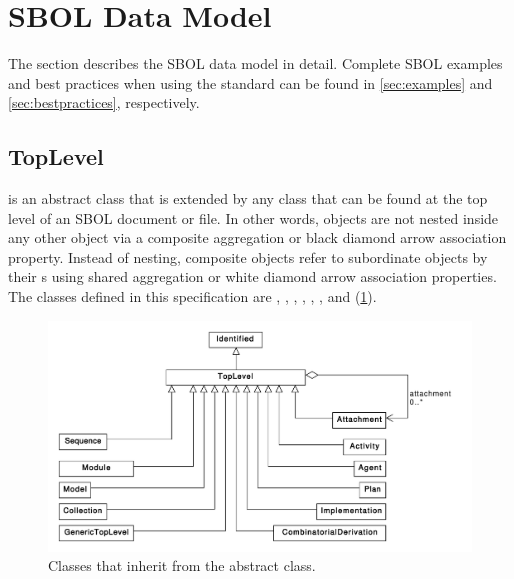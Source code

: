 
\section{SBOL Data Model}\label{sec:model}

The section describes the SBOL data model in detail. Complete SBOL examples and best practices when using the standard can be found in \ref{sec:examples} and \ref{sec:bestpractices}, respectively.



\subsection {TopLevel}
\label{sec:TopLevel}
 is an abstract class that is extended by any  class that can be found at the top level of an SBOL document or file. In other words,  objects are not nested inside any other object via a composite aggregation or black diamond arrow association property. Instead of nesting, composite  objects refer to subordinate  objects by their s using shared aggregation or white diamond arrow association properties. The  classes defined in this specification are , , , , , , and (\ref{uml:toplevel}).


\begin{figure}[ht]
\begin{center}
\includegraphics[width=\textwidth]{uml/toplevel}
\caption[]{Classes that inherit from the  abstract class.}
\label{uml:toplevel}
\end{center}
\end{figure}


